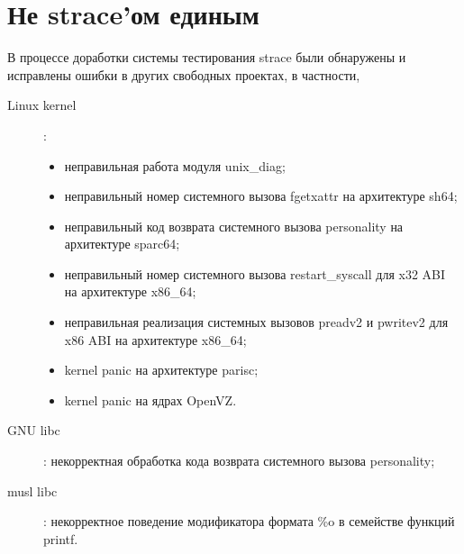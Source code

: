 \documentclass[russian,a4paper,12pt]{article}
\begin{document}
\section*{Не strace'ом единым}
В процессе доработки системы тестирования strace были обнаружены и
исправлены ошибки в других свободных проектах, в частности,
\begin{description}
\item [Linux kernel]:
	\begin{itemize}
	\item неправильная работа модуля unix\_diag\cite{diag};
	\item неправильный номер системного вызова fgetxattr на архитектуре
	sh64\cite{sh64};
	\item неправильный код возврата системного вызова personality на
	архитектуре sparc64\cite{sparc64};
	\item неправильный номер системного вызова restart\_syscall для x32
	ABI на архитектуре x86\_64\cite{x32};
	\item неправильная реализация системных вызовов preadv2 и pwritev2
	для x86 ABI на архитектуре x86\_64\cite{x86};
	\item kernel panic на архитектуре parisc\cite{parisc};
	\item kernel panic на ядрах OpenVZ.
	\end{itemize}
\item [GNU libc]: некорректная обработка кода возврата системного вызова
personality\cite{glibc};
\item [musl libc]: некорректное поведение модификатора формата \%o в семействе
функций printf\cite{musl}.
\end{description}
\end{document}
